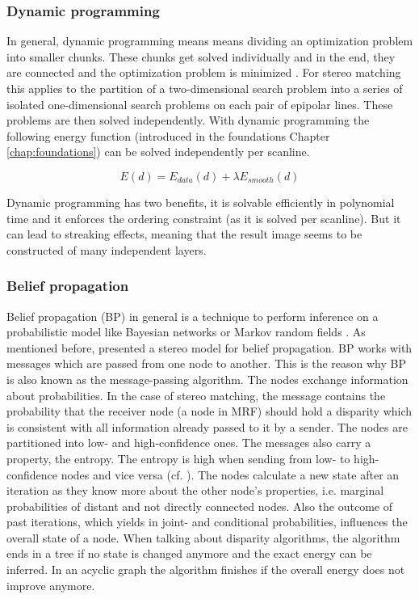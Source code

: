 \subsubsection{Dynamic programming}

In general, dynamic programming means means dividing an optimization problem into smaller chunks.
These chunks get solved individually and in the end, they are connected and the optimization problem is minimized \citep{angel1972dynamic, bellman2015applied, cyganek2011introduction}.
For stereo matching this applies to the partition of a two-dimensional search problem into a series of isolated one-dimensional search problems on each pair of epipolar lines.
These problems are then solved independently.
With dynamic programming the following energy function (introduced in the foundations Chapter \ref{chap:foundations}) can be solved independently per scanline.

\begin{equation}
  E(d) = E_{data}(d) + \lambda E_{smooth}(d)
\end{equation}

\noindent Dynamic programming has two benefits, it is solvable efficiently in polynomial time and it enforces the ordering constraint (as it is solved per scanline).
But it can lead to streaking effects, meaning that the result image seems to be constructed of many independent layers.

\subsubsection{Belief propagation}

Belief propagation (BP) in general is a technique to perform inference on a probabilistic model like Bayesian networks or Markov random fields \citep{yedidia2003understanding, tappen2003comparison, cyganek2011introduction}.
As mentioned before, \citeauthor{sun2003stereo} presented a stereo model for belief propagation.
BP works with messages which are passed from one node to another.
This is the reason why BP is also known as the message-passing algorithm.
The nodes exchange information about probabilities.
In the case of stereo matching, the message contains the probability that the receiver node (a node in MRF) should hold a disparity which is consistent with all information already passed to it by a sender.
The nodes are partitioned into low- and high-confidence ones.
The messages also carry a property, the entropy.
The entropy is high when sending from low- to high-confidence nodes and vice versa (cf. \citep{yedidia2003understanding, tappen2003comparison, cyganek2011introduction}).
The nodes calculate a new state after an iteration as they know more about the other node's properties, i.e. marginal probabilities of distant and not directly connected nodes.
Also the outcome of past iterations, which yields in joint- and conditional probabilities, influences the overall state of a node.
When talking about disparity algorithms, the algorithm ends in a tree if no state is changed anymore and the exact energy can be inferred.
In an acyclic graph the algorithm finishes if the overall energy does not improve anymore.

